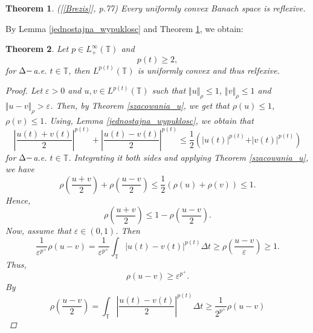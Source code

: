 \documentclass[12pt,a4paper,oneside,titlepage]{article}
\newtheorem{Twierdzenie}{Theorem}
\renewcommand{\epsilon}{\varepsilon}
\begin{document}
\begin{Twierdzenie} 
\label{refleksywnoc}
([\ref{Brezis}], p.77) Every uniformly convex Banach space is reflexive. 
\end{Twierdzenie}


By Lemma \ref{jednostajna_wypuklosc} and Theorem \ref{refleksywnoc}, we obtain:
\begin{Twierdzenie} 
\label{refleksywnosc_p>1}
Let $p \in L^{ \infty}_{+}(\mathbb{T})$ and 
\begin{equation}
\nonumber
p(t) \geq 2,
\end{equation}
for $\Delta \-- $a.e. $t \in \mathbb{T}$, then $L^{p(t)}(\mathbb{T})$ is uniformly convex and thus relfexive. 

\begin{proof}
Let $\epsilon >0$ and $u,v \in L^{p(t)}(\mathbb{T})$ such that $\Vert u \Vert_{\rho} \leq 1$, $\Vert v \Vert_{\rho} \leq 1$ and $\Vert u -v \Vert_{\rho}> \epsilon$. Then, by Theorem \ref{szacowania_u}, we get that $\rho(u)\leq 1 $, $\rho(v) \leq 1$. Using, Lemma \ref{jednostajna_wypuklosc}, we obtain that
\begin{equation}
\nonumber
\left\vert \frac{u(t)+v(t)}{2} \right\vert^{p(t)} + \left\vert \frac{u(t)-v(t)}{2} \right\vert^{p(t)} \leq \frac{1}{2} \left( \vert u(t) \vert^{p(t)} + \vert v(t) \vert^{p(t)} \right)
\end{equation}
for $\Delta \-- $a.e. $t \in \mathbb{T}$. Integrating it both sides and applying Theorem \ref{szacowania_u}, we have
\begin{equation}
\nonumber
\rho\left(\frac{u+v}{2}\right) + \rho\left(\frac{u-v}{2}\right) \leq \frac{1}{2} \left( \rho(u) + \rho(v) \right) \leq 1.
\end{equation}
Hence,
\begin{equation}
\rho \left(\frac{u+v}{2} \right) \leq 1 - \rho \left(\frac{u-v}{2} \right).
\end{equation}
Now, assume that $\epsilon \in (0,1)$. Then
\begin{equation}
\nonumber
\frac{1}{\epsilon^{p^+}} \rho(u-v) = \frac{1}{\epsilon^{p^+}} \int_{\mathbb{T}} \vert u(t) - v(t) \vert^{p(t)} \Delta t \geq \rho \left( \frac{u-v}{\epsilon} \right) \geq 1.
\end{equation}
Thus,
\begin{equation}
\label{47}
\rho(u-v) \geq \epsilon^{p^+}.
\end{equation}
By
\begin{equation}
\nonumber
\rho \left( \frac{u-v}{2} \right) = \int_{\mathbb{T}} \left\vert \frac{u(t)-v(t)}{2} \right\vert^{p(t)} \Delta t \geq \frac{1}{2^{p^+}} \rho(u-v) 

\end{equation}
\end{proof}
\end{Twierdzenie}
\end{document}
